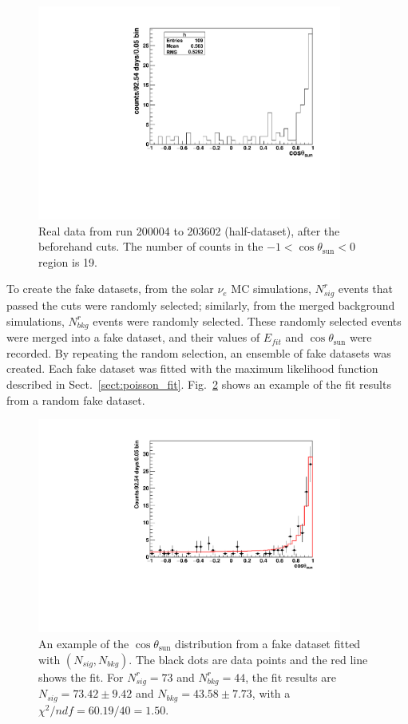 \begin{figure}[!htb]
	\centering
	\includegraphics[width=10cm]{cosThetaToSun_halfData_5to15.pdf}
	\caption[Real data from run 200004 to 203602, after the beforehand cuts.]{Real data from run 200004 to 203602 (half-dataset), after the beforehand cuts. The number of counts in the $-1<\cos\theta_\mathrm{sun}<0$ region is 19. \label{half_data}}
\end{figure}

To create the fake datasets, from the solar $\nu_e$ MC simulations, $N^r_{sig}$ events that passed the cuts were randomly selected; similarly, from the merged background simulations, $N^r_{bkg}$ events were randomly selected. These randomly selected events were merged into a fake dataset, and their values of $E_{fit}$ and $\cos\theta_\mathrm{sun}$ were recorded.
By repeating the random selection, an ensemble of fake datasets was created. Each fake dataset was fitted with the maximum likelihood function described in Sect.~\ref{sect:poisson_fit}. Fig.~\ref{ensemble_test} shows an example of the fit results from a random fake dataset.

\begin{figure}[!htb]
	\centering
	\includegraphics[width=10cm]{ensemble_fitExample.pdf}
	\caption[An example of the $\cos\theta_\mathrm{sun}$ distribution fitted with $(N_{sig},N_{bkg})$.]{An example of the $\cos\theta_\mathrm{sun}$ distribution from a fake dataset fitted with $(N_{sig},N_{bkg})$. The black dots are data points and the red line shows the fit. For $N^r_{sig} = 73$ and $N^r_{bkg}=44$, the fit results are $N_{sig} = 73.42\pm9.42$ and $N_{bkg} = 43.58 \pm 7.73$, with a $\chi^2/ndf = 60.19/40 = 1.50$.	\label{ensemble_test}}
\end{figure} 

